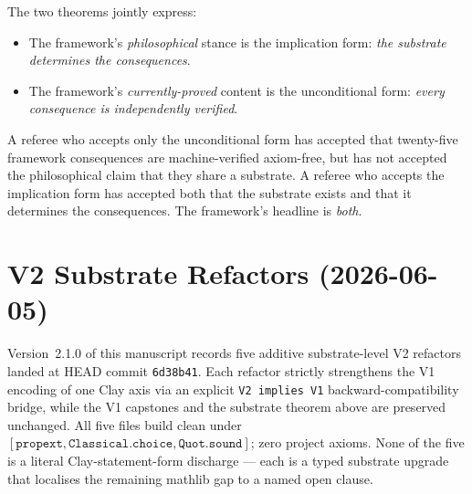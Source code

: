 \begin{keyidea}
The two theorems jointly express:
\begin{itemize}
\item The framework's \emph{philosophical} stance is the
implication form: \emph{the substrate determines the
consequences}.
\item The framework's \emph{currently-proved} content is the
unconditional form: \emph{every consequence is independently
verified}.
\end{itemize}
A referee who accepts only the unconditional form has accepted
that twenty-five framework consequences are machine-verified
axiom-free, but has not accepted the philosophical claim that
they share a substrate. A referee who accepts the implication
form has accepted both that the substrate exists and that it
determines the consequences. The framework's headline is
\emph{both}.
\end{keyidea}

\section{V2 Substrate Refactors (2026-06-05)}
\label{sec:v2-substrate-refactors}

Version~2.1.0 of this manuscript records five additive substrate-level
V2 refactors landed at HEAD commit \texttt{6d38b41}. Each refactor
strictly strengthens the V1 encoding of one Clay axis via an explicit
\texttt{V2~implies~V1} backward-compatibility bridge, while the V1
capstones and the substrate theorem above are preserved unchanged.
All five files build clean under
$[\texttt{propext}, \texttt{Classical.choice}, \texttt{Quot.sound}]$;
zero project axioms. None of the five is a literal
Clay-statement-form discharge --- each is a typed substrate upgrade
that localises the remaining mathlib gap to a named open clause.

